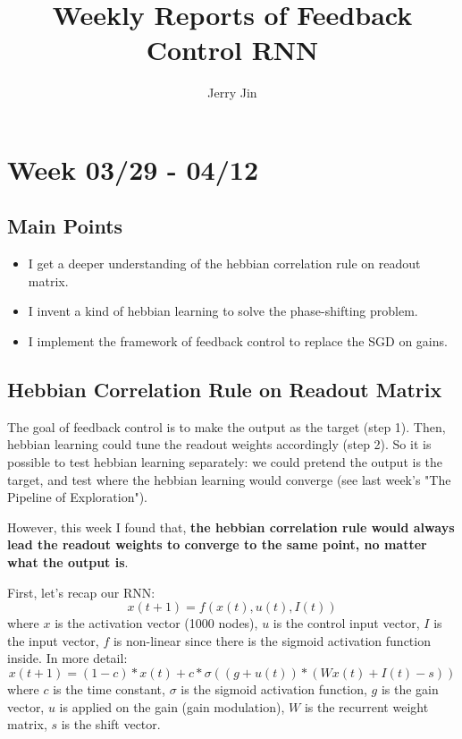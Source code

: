 \documentclass[12pt, a4paper]{article}
\title{Weekly Reports of Feedback Control RNN}
\author{Jerry Jin}
\begin{document}
\maketitle

\section*{Week 03/29 - 04/12}

\subsection*{Main Points}

\noindent
\begin{itemize}
    \item I get a deeper understanding of the hebbian correlation rule on readout matrix.
    \item I invent a kind of hebbian learning to solve the phase-shifting problem.
    \item I implement the framework of feedback control to replace the SGD on gains.

\end{itemize}

\newpage

\subsection*{Hebbian Correlation Rule on Readout Matrix}

The goal of feedback control is to make the output as the target (step 1). Then, hebbian learning could tune the readout weights accordingly (step 2). So it is possible to test hebbian learning separately: we could pretend the output is the target, and test where the hebbian learning would converge (see last week's "The Pipeline of Exploration").

However, this week I found that, \textbf{the hebbian correlation rule would always lead the readout weights to converge to the same point, no matter what the output is}.

First, let's recap our RNN:
$$x(t+1) = f(x(t), u(t), I(t))$$
where $x$ is the activation vector (1000 nodes), $u$ is the control input vector, $I$ is the input vector, $f$ is non-linear since there is the sigmoid activation function inside. In more detail:
$$x(t+1) = (1-c)*x(t) + c*\sigma((g+u(t)) * (Wx(t) + I(t) - s))$$
where $c$ is the time constant, $\sigma$ is the sigmoid activation function, $g$ is the gain vector, $u$ is applied on the gain (gain modulation), $W$ is the recurrent weight matrix, $s$ is the shift vector.
\end{document}

